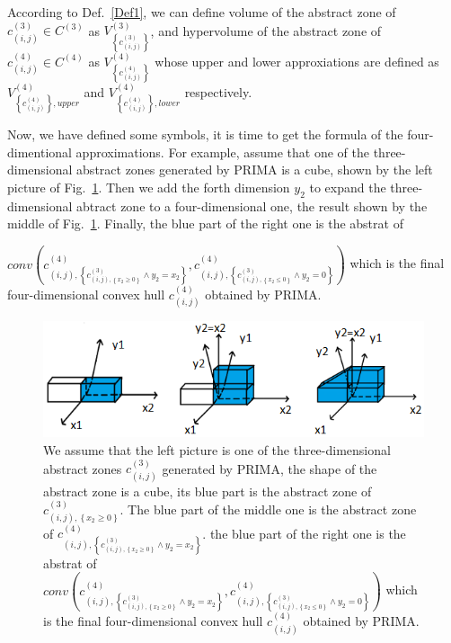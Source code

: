 \documentclass[runningheads]{llncs}
\begin{document}
\begin{definition}\label{Def2}
According to Def.~\ref{Def1}, we can define volume of the abstract zone of $c_{\left ( i,j\right )}^{(3)}\in C^{(3)}$ as $V_{\left \{c_{(i,j)}^{(3)} \right \}}^{(3)}$, and hypervolume of the abstract zone of $c_{\left ( i,j\right )}^{(4)}\in C^{(4)}$ as  $V_{\left \{c_{(i,j)}^{(4)} \right \}}^{(4)}$ whose upper and  lower approxiations are defined as $V_{\left \{c_{(i,j)}^{(4)} \right \},upper}^{(4)}$ and $V_{\left \{c_{(i,j)}^{(4)} \right \},lower}^{(4)}$ respectively.
\end{definition}


Now, we have defined some symbols, it is time to get the formula of the four-dimentional approximations. For example, assume that one of the three-dimensional abstract zones generated by PRIMA is a cube, shown by the left picture of Fig.~\ref{fig3}. Then we add the forth dimension $y_{2}$ to expand the three-dimensional abtract zone to a four-dimensional one, the result shown by the middle of Fig.~\ref{fig3}. Finally, the blue part of the right one is the abstrat of 
\par $conv(c_{\left ( i,j\right ),\left \{ c^{(3)}_{\left ( i,j\right ),\left \{x_{2}\geq 0\right \}}\wedge y_{2}=x_{2}\right \}}^{(4)},c_{\left ( i,j\right ),\left \{ c^{(3)}_{\left ( i,j\right ),\left \{x_{2}\leq 0\right \}}\wedge y_{2}=0\right \}}^{(4)})$ which is the final four-dimensional convex hull $c_{(i,j)}^{(4)}$ obtained by PRIMA.
\begin{figure}
\includegraphics[width=\textwidth]{../Fig/FigR2_1.png}
\caption{We assume that the left picture is one of the three-dimensional abstract zones $c^{(3)}_{( i,j)}$ generated by PRIMA, the shape of the abstract zone is a cube, its blue part is the abstract zone of $c^{(3)}_{\left ( i,j\right ),\left \{x_{2}\geq 0\right \}}$.
The blue part of the middle one is the abstract zone of $c_{\left ( i,j\right ),\left \{ c^{(3)}_{\left ( i,j\right ),\left \{x_{2}\geq 0\right \}}\wedge y_{2}=x_{2}\right \}}^{(4)}$. the blue part of the right one is the abstrat of $conv(c_{\left ( i,j\right ),\left \{ c^{(3)}_{\left ( i,j\right ),\left \{x_{2}\geq 0\right \}}\wedge y_{2}=x_{2}\right \}}^{(4)},c_{\left ( i,j\right ),\left \{ c^{(3)}_{\left ( i,j\right ),\left \{x_{2}\leq 0\right \}}\wedge y_{2}=0\right \}}^{(4)})$ which is the final four-dimensional convex hull $c_{(i,j)}^{(4)}$ obtained by PRIMA.} \label{fig3}
\end{figure}
\end{document}
